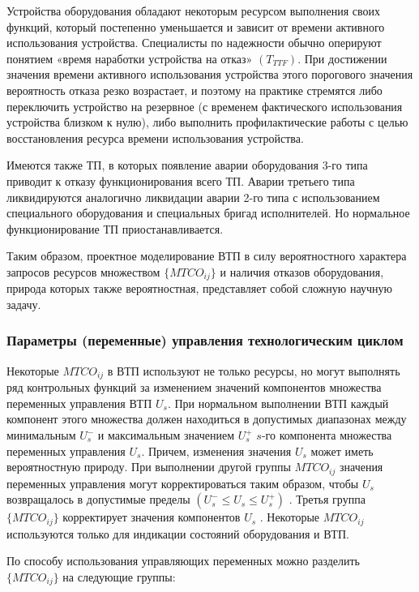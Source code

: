 Устройства оборудования обладают некоторым ресурсом выполнения своих функций, который постепенно уменьшается и зависит от времени активного использования устройства. Специалисты по надежности обычно оперируют понятием «время наработки устройства на отказ» $(T_{TTF})$. При достижении значения времени активного использования устройства этого порогового значения вероятность отказа резко возрастает, и поэтому на практике стремятся либо переключить устройство на резервное (с временем фактического использования устройства близком к нулю), либо выполнить профилактические работы с целью восстановления ресурса времени использования устройства.

Имеются также ТП, в которых появление аварии оборудования 3-го типа приводит к отказу функционирования всего ТП. Аварии третьего типа ликвидируются аналогично ликвидации аварии 2-го типа с использованием специального оборудования и специальных бригад исполнителей. Но нормальное функционирование ТП приостанавливается.

Таким образом, проектное моделирование ВТП в силу  вероятностного характера запросов ресурсов множеством $\big\{MTCO_{ij}\big\}$ и наличия отказов оборудования, природа которых также вероятностная, представляет собой сложную научную задачу.


\subsubsection{Параметры (переменные) управления технологическим циклом}

Некоторые $MTCO_{ij}$ в ВТП используют не только ресурсы, но могут выполнять ряд контрольных функций за изменением значений компонентов множества переменных управления ВТП ${U_s}$. При нормальном выполнении ВТП каждый компонент этого множества должен находиться в допустимых диапазонах между минимальным ${U_s^-}$ и максимальным значением ${U_s^+}$ $s$-го компонента множества переменных управления ${U_s}$. Причем, изменения значения $U_s$ может иметь вероятностную природу.
При выполнении другой группы $MTCO_{ij}$ значения переменных управления могут корректироваться таким образом, чтобы $U_s$ возвращалось в допустимые пределы $(U_s^- \leq U_s\leq U_s^+)$ . Третья группа $\big\{MTCO_{ij}\big\}$ корректирует значения компонентов ${U_s}$ . Некоторые $MTCO_{ij}$ используются только для индикации состояний оборудования и ВТП.

По способу использования управляющих переменных можно разделить $\big\{MTCO_{ij}\big\}$ на следующие группы:


